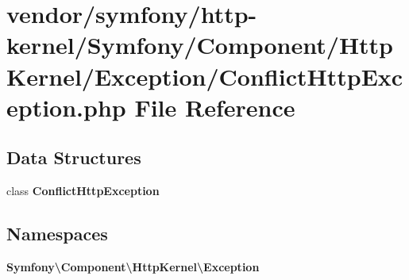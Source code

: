 \section{vendor/symfony/http-\/kernel/\+Symfony/\+Component/\+Http\+Kernel/\+Exception/\+Conflict\+Http\+Exception.php File Reference}
\label{_conflict_http_exception_8php}
\subsection*{Data Structures}
\begin{DoxyCompactItemize}
\item 
class {\bf Conflict\+Http\+Exception}
\end{DoxyCompactItemize}
\subsection*{Namespaces}
\begin{DoxyCompactItemize}
\item 
 {\bf Symfony\textbackslash{}\+Component\textbackslash{}\+Http\+Kernel\textbackslash{}\+Exception}
\end{DoxyCompactItemize}

